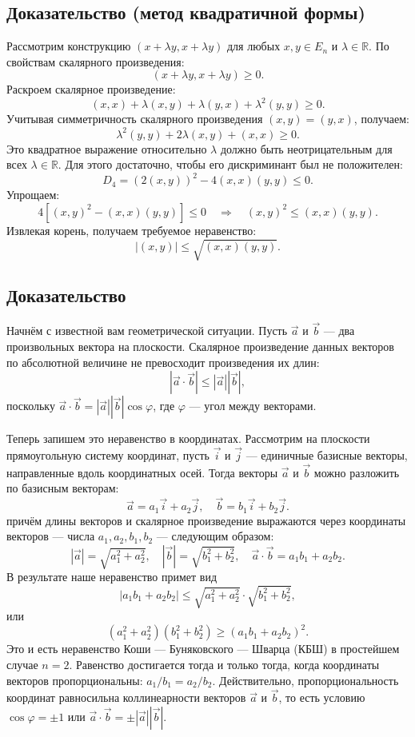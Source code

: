 \documentclass[12pt]{article}
\begin{document}
\subsection*{Доказательство (метод квадратичной формы)}
Рассмотрим конструкцию $(x + \lambda y, x + \lambda y)$ для любых $x, y \in E_n$ и $\lambda \in \mathbb{R}$. По свойствам скалярного произведения:
$$
(x + \lambda y, x + \lambda y) \geq 0.
$$
Раскроем скалярное произведение:
$$
(x, x) + \lambda (x, y) + \lambda (y, x) + \lambda^2 (y, y) \geq 0.
$$
Учитывая симметричность скалярного произведения $(x, y) = (y, x)$, получаем:
$$
\lambda^2 (y, y) + 2\lambda (x, y) + (x, x) \geq 0.
$$
Это квадратное выражение относительно $\lambda$ должно быть неотрицательным для всех $\lambda \in \mathbb{R}$. Для этого достаточно, чтобы его дискриминант был не положителен:
$$
D_4 = (2(x, y))^2 - 4(x, x)(y, y) \leq 0.
$$
Упрощаем:
$$
4[(x, y)^2 - (x, x)(y, y)] \leq 0 \quad \Rightarrow \quad (x, y)^2 \leq (x, x)(y, y).
$$
Извлекая корень, получаем требуемое неравенство:
$$
|(x, y)| \leq \sqrt{(x, x)(y, y)}.
$$

\subsection*{Доказательство}
Начнём с известной вам геометрической ситуации. Пусть $\vec{a}$ и $\vec{b}$ — два произвольных вектора на плоскости. Скалярное произведение данных векторов по абсолютной величине не превосходит произведения их длин:
$$
|\vec{a} \cdot \vec{b}| \leq |\vec{a}| |\vec{b}|,
$$
поскольку $\vec{a} \cdot \vec{b} = |\vec{a}| |\vec{b}| \cos \varphi$, где $\varphi$ — угол между векторами.

Теперь запишем это неравенство в координатах. Рассмотрим на плоскости прямоугольную систему координат, пусть $\vec{i}$ и $\vec{j}$ — единичные базисные векторы, направленные вдоль координатных осей. Тогда векторы $\vec{a}$ и $\vec{b}$ можно разложить по базисным векторам:
$$
\vec{a} = a_1 \vec{i} + a_2 \vec{j}, \quad \vec{b} = b_1 \vec{i} + b_2 \vec{j}.
$$
причём длины векторов и скалярное произведение выражаются через координаты векторов — числа $a_1, a_2, b_1, b_2$ — следующим образом:
$$
|\vec{a}| = \sqrt{a_1^2 + a_2^2}, \quad |\vec{b}| = \sqrt{b_1^2 + b_2^2}, \quad \vec{a} \cdot \vec{b} = a_1 b_1 + a_2 b_2.
$$
В результате наше неравенство примет вид
$$
|a_1 b_1 + a_2 b_2| \leq \sqrt{a_1^2 + a_2^2} \cdot \sqrt{b_1^2 + b_2^2},
$$
или
$$
(a_1^2 + a_2^2)(b_1^2 + b_2^2) \geq (a_1 b_1 + a_2 b_2)^2.
$$
Это и есть неравенство Коши — Буняковского — Шварца (КБШ) в простейшем случае $n = 2$. Равенство достигается тогда и только тогда, когда координаты векторов пропорциональны: $a_1/b_1 = a_2/b_2$. Действительно, пропорциональность координат равносильна коллинеарности векторов $\vec{a}$ и $\vec{b}$, то есть условию $\cos \varphi = \pm 1$ или $\vec{a} \cdot \vec{b} = \pm |\vec{a}| |\vec{b}|$.
\end{document}
